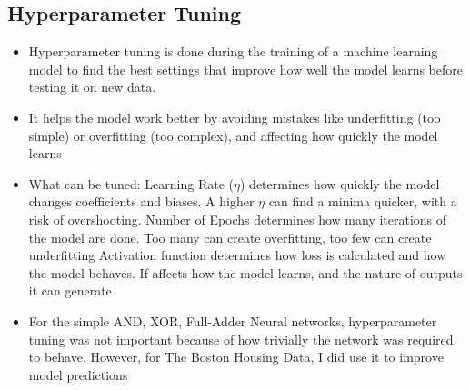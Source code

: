 \documentclass[12pt,a4paper]{article}
\begin{document}
\subsection{Hyperparameter Tuning}
\begin{itemize}
\item Hyperparameter tuning is done during the training of a machine learning model to find the best settings that improve how well the model learns before testing it on new data.
\item It helps the model work better by avoiding mistakes like underfitting (too simple) or overfitting (too complex), and affecting how quickly the model learns
\item What can be tuned:
\subitem Learning Rate ($\eta$) determines how quickly the model changes coefficients and biases. A higher $\eta$ can find a minima quicker, with a risk of overshooting.
\subitem Number of Epochs determines how many iterations of the model are done. Too many can create overfitting, too few can create underfitting
\subitem Activation function determines how loss is calculated and how the model behaves. If affects how the model learns, and the nature of outputs it can generate
\item For the simple AND, XOR, Full-Adder Neural networks, hyperparameter tuning was not important because of how trivially the network was required to behave. However, for The Boston Housing Data, I did use it to improve model predictions
\end{itemize}
\end{document}
